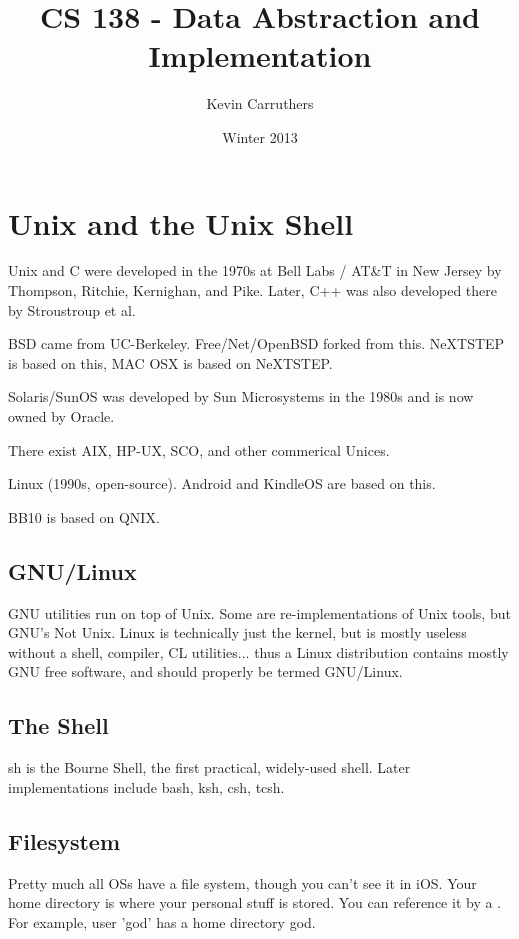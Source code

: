 \documentclass[12pt]{article}
\begin{document}
\title{CS 138 - Data Abstraction and Implementation}
\author{Kevin Carruthers}
\date{\vspace{-2ex}Winter 2013}
\maketitle\HRule

\section*{Unix and the Unix Shell}
Unix and C were developed in the 1970s at Bell Labs / AT\&T in New Jersey by Thompson, Ritchie, Kernighan, and Pike. Later, C++ was also developed there by Stroustroup et al.

BSD came from UC-Berkeley. Free/Net/OpenBSD forked from this. NeXTSTEP is based on this, MAC OSX is based on NeXTSTEP.

Solaris/SunOS was developed by Sun Microsystems in the 1980s and is now owned by Oracle.

There exist AIX, HP-UX, SCO, and other commerical Unices.

Linux (1990s, open-source). Android and KindleOS are based on this.

BB10 is based on QNIX.

\subsection*{GNU/Linux}
GNU utilities run on top of Unix. Some are re-implementations of Unix tools, but GNU's Not Unix. Linux is technically just the kernel, but is mostly useless without a shell, compiler, CL utilities... thus a Linux distribution contains mostly GNU free software, and should properly be termed GNU/Linux.

\subsection*{The Shell}
sh is the Bourne Shell, the first practical, widely-used shell. Later implementations include bash, ksh, csh, tcsh.

\subsection*{Filesystem}
Pretty much all OSs have a file system, though you can't see it in iOS. Your home directory is where your personal stuff is stored. You can reference it by a \ttilde. For example, user 'god' has a home directory \ttilde god.
\end{document}
